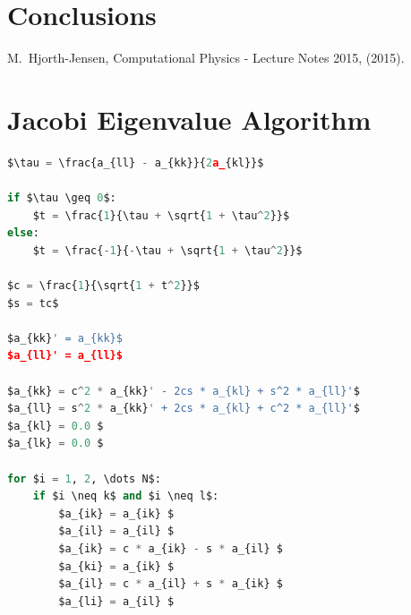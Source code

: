 \documentclass[10pt,showpacs,preprintnumbers,footinbib,amsmath,amssymb,aps,prl,twocolumn,groupedaddress,superscriptaddress,showkeys]{revtex4-1}
\begin{document}
\section{Conclusions}

\begin{thebibliography}{99}
 M.~Hjorth-Jensen, Computational Physics - Lecture Notes 2015, (2015).
\end{thebibliography}

\newpage
\appendix
\section{Jacobi Eigenvalue Algorithm}
\begin{lstlisting}[mathescape=true, language=python]
$\tau = \frac{a_{ll} - a_{kk}}{2a_{kl}}$

if $\tau \geq 0$:
    $t = \frac{1}{\tau + \sqrt{1 + \tau^2}}$
else:
    $t = \frac{-1}{-\tau + \sqrt{1 + \tau^2}}$

$c = \frac{1}{\sqrt{1 + t^2}}$
$s = tc$

$a_{kk}' = a_{kk}$
$a_{ll}' = a_{ll}$

$a_{kk} = c^2 * a_{kk}' - 2cs * a_{kl} + s^2 * a_{ll}'$
$a_{ll} = s^2 * a_{kk}' + 2cs * a_{kl} + c^2 * a_{ll}'$
$a_{kl} = 0.0 $
$a_{lk} = 0.0 $

for $i = 1, 2, \dots N$:
    if $i \neq k$ and $i \neq l$:
        $a_{ik} = a_{ik} $
        $a_{il} = a_{il} $
        $a_{ik} = c * a_{ik} - s * a_{il} $
        $a_{ki} = a_{ik} $
        $a_{il} = c * a_{il} + s * a_{ik} $
        $a_{li} = a_{il} $
\end{lstlisting}
\end{document}
